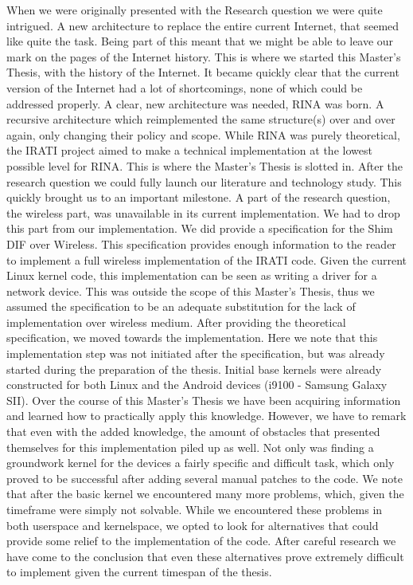 When we were originally presented with the Research question we were quite intrigued. A new architecture to replace the entire current Internet, that seemed like quite the task. Being part of this meant that we might be able to leave our mark on the pages of the Internet history. This is where we started this Master's Thesis, with the history of the Internet. It became quickly clear that the current version of the Internet had a lot of shortcomings, none of which could be addressed properly. A clear, new architecture was needed, RINA was born. A recursive architecture which reimplemented the same structure(s) over and over again, only changing their policy and scope. While RINA was purely theoretical, the IRATI project aimed to make a technical implementation at the lowest possible level for RINA. 
\npar
This is where the Master's Thesis is slotted in. After the research question we could fully launch our literature and technology study. This quickly brought us to an important milestone. A part of the research question, the wireless part, was unavailable in its current implementation. We had to drop this part from our implementation. We did provide a specification for the Shim DIF over Wireless. This specification provides enough information to the reader to implement a full wireless implementation of the IRATI code. Given the current Linux kernel code, this implementation can be seen as writing a driver for a network device. This was outside the scope of this Master's Thesis, thus we assumed the specification to be an adequate substitution for the lack of implementation over wireless medium. 
\npar
After providing the theoretical specification, we moved towards the implementation. Here we note that this implementation step was not initiated after the specification, but was already started during the preparation of the thesis. Initial base kernels were already constructed for both Linux and the Android devices (i9100 - Samsung Galaxy SII). Over the course of this Master's Thesis we have been acquiring information and learned how to practically apply this knowledge. However, we have to remark that even with the added knowledge, the amount of obstacles that presented themselves for this implementation piled up as well. Not only was finding a groundwork kernel for the devices a fairly specific and difficult task, which only proved to be successful after adding several manual patches to the code. We note that after the basic kernel we encountered many more problems, which, given the timeframe were simply not solvable. While we encountered these problems in both userspace and kernelspace, we opted to look for alternatives that could provide some relief to the implementation of the code. After careful research we have come to the conclusion that even these alternatives prove extremely difficult to implement given the current timespan of the thesis.

